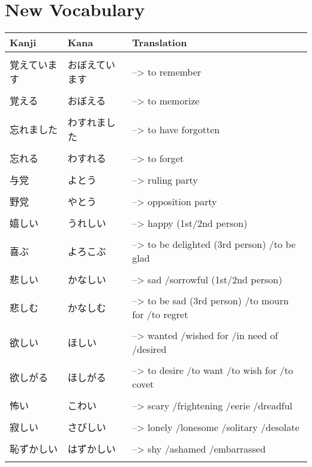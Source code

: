\documentclass{article}
\begin{document}
\part*{New Vocabulary}
\begin{tabular}{ p{3cm} | l l }
Kanji&Kana&Translation\\ \hline\\[-1em]
覚えています&おぼえています&--> to remember \\ \hline\\[-1em]
覚える &おぼえる&--> to memorize \\ \hline\\[-1em]
忘れました &わすれました&--> to have forgotten \\ \hline\\[-1em]
忘れる &わすれる&--> to forget \\ \hline\\[-1em]
与党 &よとう&--> ruling party \\ \hline\\[-1em]
野党 &やとう&--> opposition party \\ \hline\\[-1em]
嬉しい      &うれしい           &--> happy (1st/2nd person) \\ \hline\\[-1em]
喜ぶ        &よろこぶ           &--> to be delighted (3rd person) /to be glad \\ \hline\\[-1em]
悲しい      &かなしい           &--> sad /sorrowful (1st/2nd person) \\ \hline\\[-1em]
悲しむ      &かなしむ           &--> to be sad (3rd person) /to mourn for /to regret \\ \hline\\[-1em]
欲しい      &ほしい             &--> wanted /wished for /in need of /desired \\ \hline\\[-1em]
欲しがる    &ほしがる           &--> to desire /to want /to wish for /to covet \\ \hline\\[-1em]
怖い        &こわい             &--> scary /frightening /eerie /dreadful \\ \hline\\[-1em]
寂しい      &さびしい           &--> lonely /lonesome /solitary /desolate \\ \hline\\[-1em]
恥ずかしい  &はずかしい         &--> shy /ashamed /embarrassed \\ \hline\\[-1em]

\end{tabular}
\end{document}
